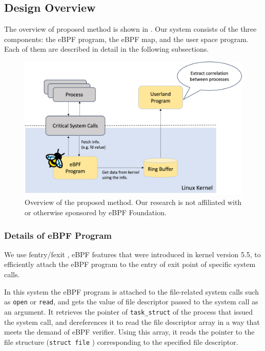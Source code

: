 \subsection{Design Overview}
The overview of proposed method is shown in .
Our system consists of the three components: the eBPF program, the eBPF map, and the user space program.
Each of them are described in detail in the following subsections.
\begin{figure}[t]
  \centering
  \includegraphics[width=1.8\columnwidth]{./img/proposal_overview.png}
  \caption{Overview of the proposed method. Our research is not
    affiliated with or otherwise sponsored by eBPF Foundation\cite{BrandGui21:online}.}
  \label{img:proposal-overview}
\end{figure}

\subsubsection{Details of eBPF Program}
We use fentry/fexit \cite{learning-ebpf}, eBPF features that were introduced in kernel version 5.5,
to efficiently attach the eBPF program to the entry of exit point of specific system calls.

In this system the eBPF program is attached to the file-related system calls such as \texttt{open} or \texttt{read},
and gets the value of file descriptor passed to the system call as an argument.
It retrieves the pointer of \texttt{task\_struct} \cite{schedhin43:online} of the process that issued the system call,
and dereferences it to read the file descriptor array in a way that meets the demand of eBPF verifier.
Using this array,
it reads the pointer to the file structure (\texttt{struct file} \cite{fshinclu57:online})
corresponding to the specified file descriptor.

